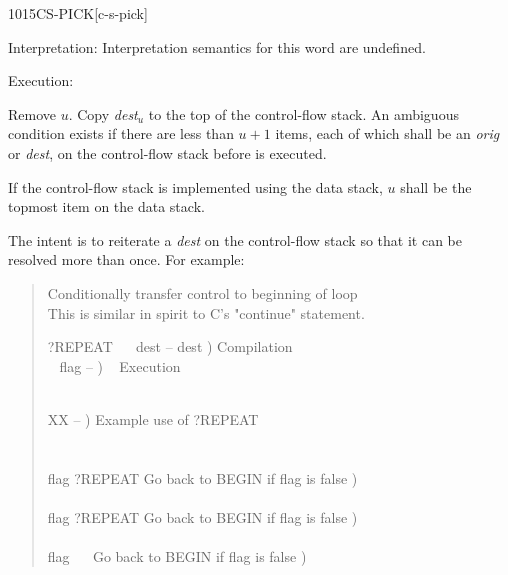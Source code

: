 \begin{newword*}{1015}{CS-PICK}[c-s-pick]
\item[Interpretation:]
	Interpretation semantics for this word are undefined.

\item[Execution:]

	Remove $u$. Copy \emph{dest}$_u$ to the top of the control-flow
	stack. An ambiguous condition exists if there are less than $u+1$
	items, each of which shall be an \emph{orig} or \emph{dest}, on
	the control-flow stack before  is executed.

	If the control-flow stack is implemented using the data stack,
	$u$ shall be the topmost item on the data stack.

	\begin{rationale} %
		The intent is to reiterate a \emph{dest} on the control-flow
		stack so that it can be resolved more than once. For example:
		\begin{quote}\ttfamily
			 Conditionally transfer control to beginning of loop \\
			 This is similar in spirit to C's "continue" statement.

			\word{:} ?REPEAT ~~ dest -- dest )  Compilation \\
			\tab\tab\tab~ flag -- ) \tab~ Execution \\
			  ~   \\
			\word{;} 

			\word{:} XX  -- )  Example use of ?REPEAT \\
			\tab {} \\
			\tab\tab {\ldots} \\
			\tab flag ?REPEAT  Go back to BEGIN if flag is false ) \\
			\tab\tab {\ldots} \\
			\tab flag ?REPEAT  Go back to BEGIN if flag is false ) \\
			\tab\tab {\ldots} \\
			\tab flag ~~  Go back to BEGIN if flag is false ) \\
			\word{;}
		\end{quote}
	\end{rationale}
\end{newword*}


